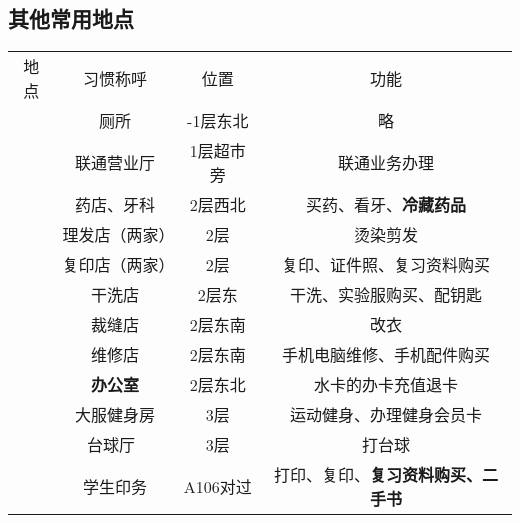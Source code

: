 \subsection[其他常用地点]{其他常用地点}
\label{common_locations}
\begin{table}[!ht]
    \vspace{-1em}
    \centering
    \begin{tabular}{|c|c|c|c|}
        \Xhline{1.2pt}
        地点                    & 习惯称呼               & 位置     & 功能                        \\
        \Xhline{1.2pt}
        \multirow{9}{*}{大服}   & 厕所                 & -1层东北  & 略                         \\
        \cline{2-4}
                              & 联通营业厅              & 1层超市旁  & 联通业务办理                    \\
        \cline{2-4}
                              & 药店、牙科              & 2层西北   & 买药、看牙、\textbf{冷藏药品}       \\
        \cline{2-4}
                              & 理发店（两家）            & 2层     & 烫染剪发                      \\
        \cline{2-4}
                              & 复印店（两家）            & 2层     & 复印、证件照、复习资料购买             \\
        \cline{2-4}
                              & 干洗店                & 2层东    & 干洗、实验服购买、配钥匙              \\
        \cline{2-4}
                              & 裁缝店                & 2层东南   & 改衣                        \\
        \cline{2-4}
                              & 维修店                & 2层东南   & 手机电脑维修、手机配件购买             \\
        \cline{2-4}
                              & \textbf{办公室}       & 2层东北   & 水卡的办卡充值退卡                 \\
        \cline{2-4}
                              & 大服健身房\footnotemark & 3层     & 运动健身、办理健身会员卡              \\
        \cline{2-4}
                              & 台球厅\               & 3层     & 打台球                       \\
        \Xhline{1.2pt}
        \multirow{3}{*}{中和广场} & 学生印务               & A106对过 & 打印、复印、\textbf{复习资料购买、二手书} \\
        \cline{2-4}

\end{tabular}
\end{table}

